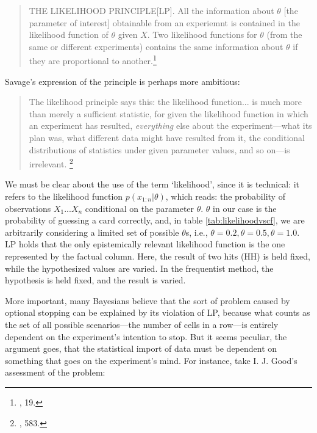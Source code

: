 \begin{quote}
THE LIKELIHOOD PRINCIPLE[LP]. All the information about $\theta$ [the parameter of interest] obtainable from an experiemnt is contained in the likelihood function of $\theta$ given $X$. Two likelihood functions for $\theta$ (from the same or different experiments) contains the same information about $\theta$ if they are proportional to another.\footnote{\cite{lp}, 19.}	
\end{quote}


Savage's expression of the principle is perhaps more ambitious:

\begin{quote}
The likelihood principle says this: the likelihood function... is much more than merely a sufficient statistic, for given the likelihood function in which an experiment has resulted, \emph{everything} else about the experiment---what its plan was, what different data might have resulted from it, the conditional distributions of statistics under given parameter values, and so on---is irrelevant. \footnote{\cite{savagerecon}, 583.}	
\end{quote}


We must be clear about the use of the term `likelihood', since it is technical: it refers to the likelihood function \(p(x_{1:n}|\theta)\), which reads: the probability of
observations \(X_1...X_n\) conditional on the parameter $\theta$. $\theta$ in our case is the probability of guessing a card correctly, and, in table \ref{tab:likelihoodvscf}, we are arbitrarily considering a limited set of possible $\theta$s, i.e., $\theta = 0.2, \theta = 0.5, \theta = 1.0$. LP holds that the only epistemically relevant likelihood function is the one represented by the factual column. Here, the result of two hits (HH) is held fixed, while the hypothesized values are varied. In the frequentist method, the hypothesis is held fixed, and the result is varied.


More important, many Bayesians believe that the sort of problem caused by
optional stopping can be explained by its violation of LP, because what counts as the set of all possible scenarios---the number of cells in a row---is entirely dependent on the experiment's intention to stop. But it seems peculiar, the argument goes, that the statistical import of data must be dependent on something that goes on the experiment's mind. For instance, take I. J. Good's assessment of the problem:

